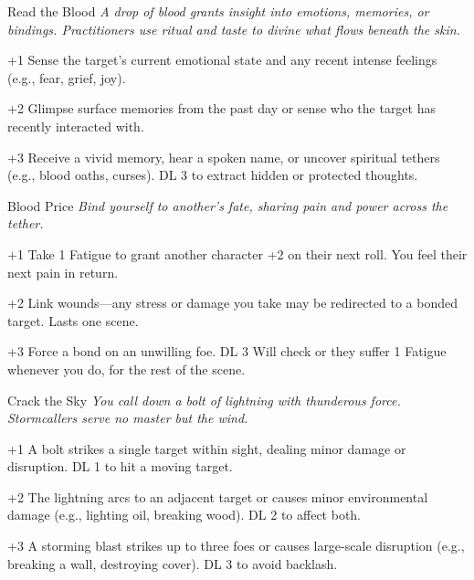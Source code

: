 \begin{WyrdSpell}[Bloodbinding]{Read the Blood}
\textit{A drop of blood grants insight into emotions, memories, or bindings. Practitioners use ritual and taste to divine what flows beneath the skin.}
    \begin{WyrdSpellBlock}
        \item[+1] Sense the target's current emotional state and any recent intense feelings (e.g., fear, grief, joy).
        \item[+2] Glimpse surface memories from the past day or sense who the target has recently interacted with.
        \item[+3] Receive a vivid memory, hear a spoken name, or uncover spiritual tethers (e.g., blood oaths, curses). DL 3 to extract hidden or protected thoughts.
    \end{WyrdSpellBlock}
\end{WyrdSpell}

\begin{WyrdSpell}[Bloodbinding]{Blood Price}
\textit{Bind yourself to another’s fate, sharing pain and power across the tether.}
    \begin{WyrdSpellBlock}
        \item[+1] Take 1 Fatigue to grant another character +2 on their next roll. You feel their next pain in return.
        \item[+2] Link wounds—any stress or damage you take may be redirected to a bonded target. Lasts one scene.
        \item[+3] Force a bond on an unwilling foe. DL 3 Will check or they suffer 1 Fatigue whenever you do, for the rest of the scene.
    \end{WyrdSpellBlock}
\end{WyrdSpell}

\begin{WyrdSpell}[Stormcalling]{Crack the Sky}
\textit{You call down a bolt of lightning with thunderous force. Stormcallers serve no master but the wind.}
    \begin{WyrdSpellBlock}
        \item[+1] A bolt strikes a single target within sight, dealing minor damage or disruption. DL 1 to hit a moving target.
        \item[+2] The lightning arcs to an adjacent target or causes minor environmental damage (e.g., lighting oil, breaking wood). DL 2 to affect both.
        \item[+3] A storming blast strikes up to three foes or causes large-scale disruption (e.g., breaking a wall, destroying cover). DL 3 to avoid backlash.
    \end{WyrdSpellBlock}
\end{WyrdSpell}


